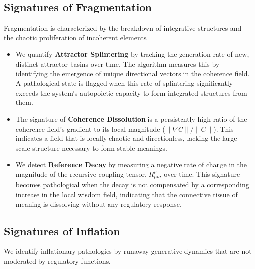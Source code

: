 
\subsection{Signatures of Fragmentation}
\label{16.3.2:signatures_of_fragmentation}

Fragmentation is characterized by the breakdown of integrative structures and the chaotic proliferation of incoherent elements.

\begin{itemize}

    \item We quantify \textbf{Attractor Splintering} by tracking the generation rate of new, distinct attractor basins over time. The algorithm measures this by identifying the emergence of unique directional vectors in the coherence field. A pathological state is flagged when this rate of splintering significantly exceeds the system's autopoietic capacity to form integrated structures from them.

    \item The signature of \textbf{Coherence Dissolution} is a persistently high ratio of the coherence field's gradient to its local magnitude (\(\|\nabla C\| / \|C\|\)). This indicates a field that is locally chaotic and directionless, lacking the large-scale structure necessary to form stable meanings.

    \item We detect \textbf{Reference Decay} by measuring a negative rate of change in the magnitude of the recursive coupling tensor, \(R^\rho_{\mu\nu}\), over time. This signature becomes pathological when the decay is not compensated by a corresponding increase in the local wisdom field, indicating that the connective tissue of meaning is dissolving without any regulatory response.

\end{itemize}


\subsection{Signatures of Inflation}
\label{16.3.3:signatures_of_inflation}

We identify inflationary pathologies by runaway generative dynamics that are not moderated by regulatory functions.

